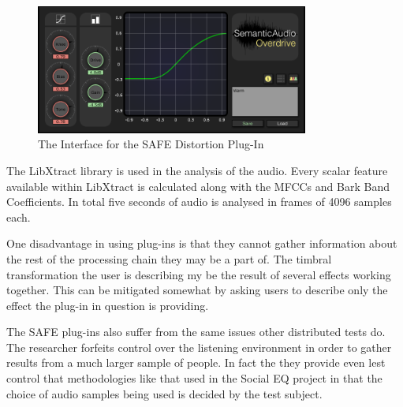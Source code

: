 			\begin{figure}[h!]
				\centering
				\includegraphics[width=0.8\textwidth]{chapter5/Images/SAFEDistortion.png}
				\caption{The Interface for the SAFE Distortion Plug-In}
				\label{fig:SAFE-Distortion}
			\end{figure}

			The LibXtract library \citep{bullock2007libxtract} is used in the analysis of the audio. Every
			scalar feature available within LibXtract is calculated along with the MFCCs and Bark Band
			Coefficients. In total five seconds of audio is analysed in frames of 4096 samples each.


			One disadvantage in using plug-ins is that they cannot gather information about the rest of the
			processing chain they may be a part of. The timbral transformation the user is describing my be the
			result of several effects working together. This can be mitigated somewhat by asking users to
			describe only the effect the plug-in in question is providing.

			The SAFE plug-ins also suffer from the same issues other distributed tests do. The researcher
			forfeits control over the listening environment in order to gather results from a much larger sample
			of people. In fact the they provide even lest control that methodologies like that used in the
			Social EQ project \citep{cartwright2013socialeq} in that the choice of audio samples being used is
			decided by the test subject. 
